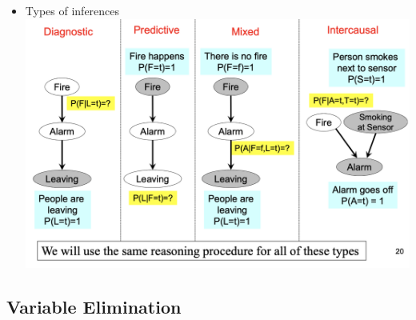 \documentclass{article}
\begin{document}
\begin{itemize}
    \item Types of inferences \\
    \includegraphics[scale=0.4]{types_of_inference}
\end{itemize}

\subsection{Variable Elimination}
\end{document}
